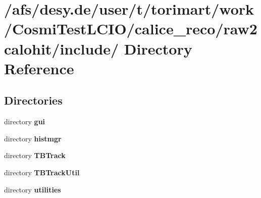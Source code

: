 \section{/afs/desy.de/user/t/torimart/work/CosmiTestLCIO/calice\_\-reco/raw2calohit/include/ Directory Reference}
\label{dir_00bb554db34f7d161363d731ebcfc1c3}
\subsection*{Directories}
\begin{DoxyCompactItemize}
\item 
directory {\bf gui}
\item 
directory {\bf histmgr}
\item 
directory {\bf TBTrack}
\item 
directory {\bf TBTrackUtil}
\item 
directory {\bf utilities}
\end{DoxyCompactItemize}
